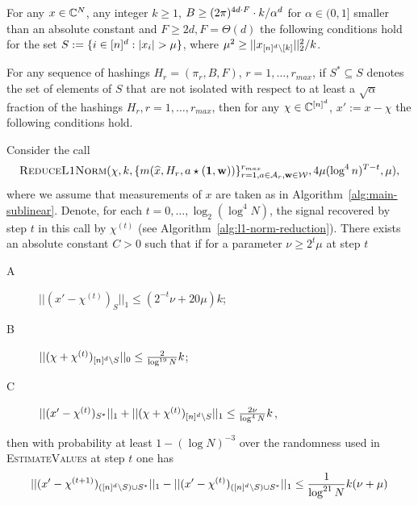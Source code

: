 \begin{lemma}\label{lm:small-l1-increment}
For any $x\in \mathbb{C}^N$, any integer $k\geq 1$, $B\geq (2\pi)^{4d\cdot F}\cdot k/\alpha^d$ for $\alpha\in (0, 1]$ smaller than an absolute constant and $F\geq 2d, F=\Theta(d)$ the following conditions hold for the set $S:=\{i\in \nsq: |x_i|>\mu\}$, where $\mu^2\geq ||x_{{[n]^d}\setminus [k]}||_2^2/k$.

For any sequence of hashings $H_r=(\pi_r, B, F)$, $r=1,\ldots, r_{max}$, if $S^*\subseteq S$ denotes the set of elements of $S$ that are not isolated with respect to at least a $\sqrt{\alpha}$ fraction of the hashings  $H_r, r=1,\ldots, r_{max}$, then for any $\chi\in \mathbb{C}^{[n]^d}$, $x':=x-\chi$ the following conditions hold.

Consider the call 
$$
\Call{ReduceL1Norm}{\chi, k, \{m(\wh{x}, H_r, a\star (\one, \h))\}_{r=1, a\in \A_r, \h\in \H}^{r_{max}}, 4\mu (\log^4 n)^{T-t}, \mu},
$$ 
where we assume that measurements of $x$ are taken as in Algorithm~\ref{alg:main-sublinear}. Denote, for each $t=0,\ldots, \log_2(\log^4 N)$, the signal recovered by step $t$ in this call by $\chi^{(t)}$ (see Algorithm~\ref{alg:l1-norm-reduction}). There exists an absolute constant $C>0$ such that if for a parameter $\nu\geq 2^t \mu$ at step $t$
\begin{description}
\item[A] $||(x'-\chi^{(t)})_S||_1\leq  (2^{-t}\nu+20\mu) k$;
\item[B] $||(\chi+\chi^{(t)})_{{[n]^d}\setminus S}||_0\leq \frac2{\log^{19} N} k$;
\item[C] $||(x'-\chi^{(t)})_{S^*}||_1+||(\chi+\chi^{(t)})_{{[n]^d}\setminus S}||_1\leq \frac{2\nu}{\log^4 N} k$,
\end{description}
then  with probability at least $1-(\log N)^{-3}$ over the randomness used in \textsc{EstimateValues} at step $t$ one has
$$
||(x'-\chi^{(t+1)})_{({[n]^d}\setminus S)\cup S^*}||_1-||(x'-\chi^{(t)})_{({[n]^d}\setminus S)\cup S^*}||_1\leq \frac{1}{\log^{21} N}k (\nu+\mu)
$$
\end{lemma}
